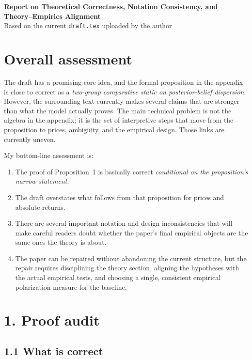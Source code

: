 \documentclass[11pt]{article}
\begin{document}
\begin{center}
{\Large \textbf{Report on Theoretical Correctness, Notation Consistency, and Theory--Empirics Alignment}}\\[0.4em]
{\normalsize Based on the current \texttt{draft.tex} uploaded by the author}
\end{center}

\section*{Overall assessment}

The draft has a promising core idea, and the formal proposition in the appendix is close to correct as a \emph{two-group comparative static on posterior-belief dispersion}. However, the surrounding text currently makes several claims that are stronger than what the model actually proves. The main technical problem is not the algebra in the appendix; it is the set of interpretive steps that move from the proposition to prices, ambiguity, and the empirical design. Those links are currently uneven.

My bottom-line assessment is:

\begin{enumerate}[leftmargin=1.5em]
    \item The proof of Proposition~1 is basically correct \emph{conditional on the proposition's narrow statement}.
    \item The draft overstates what follows from that proposition for prices and absolute returns.
    \item There are several important notation and design inconsistencies that will make careful readers doubt whether the paper's final empirical objects are the same ones the theory is about.
    \item The paper can be repaired without abandoning the current structure, but the repair requires disciplining the theory section, aligning the hypotheses with the actual empirical tests, and choosing a single, consistent empirical polarization measure for the baseline.
\end{enumerate}

\section*{1. Proof audit}

\subsection*{1.1 What is correct}
\end{document}
